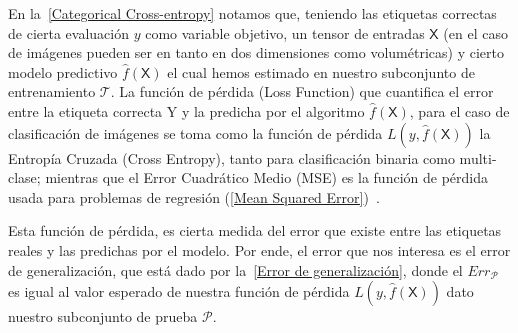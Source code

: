 En la~\autoref{Categorical Cross-entropy} notamos que, teniendo las etiquetas
correctas de cierta evaluación \(y\) como variable objetivo, un tensor de
entradas \(\mathsf{X}\) (en el caso de imágenes pueden ser en tanto en dos
dimensiones como volumétricas) y cierto modelo predictivo
\(\hat{f}(\mathsf{X})\) el cual hemos estimado en nuestro subconjunto de
entrenamiento \(\mathcal{T}\). La función de pérdida (Loss Function) que
cuantifica el error entre la etiqueta correcta Y y la predicha por el algoritmo
\(\hat{f}(\mathsf{X})\), para el caso de clasificación de imágenes se toma como
la función de pérdida \(L(y , \hat{f}(\mathsf{X}))\) la Entropía Cruzada (Cross
Entropy), tanto para clasificación binaria como multi-clase; mientras que el
Error Cuadrático Medio (MSE) es la función de pérdida usada para problemas de
regresión (\autoref{Mean Squared Error})~\cite{Hastie2009}.

 



Esta función de pérdida, es cierta medida del error que existe entre las
etiquetas reales y las predichas por el modelo. Por ende, el error que nos
interesa es el error de generalización, que está dado por la~\autoref{Error de
generalización}, donde el \(Err_{\mathcal{P}}\) es igual al valor esperado de
nuestra función de pérdida \(L(y , \hat{f}(\mathsf{X}))\) dato nuestro
subconjunto de prueba \(\mathcal{P}\).

